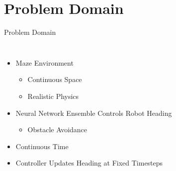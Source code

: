 \documentclass{beamer}
\begin{document}
\section{Problem Domain}

	\begin{frame}{Problem Domain}

		\begin{columns}[c c]
		
				
				\begin{itemize}
				\item Maze Environment
					\begin{itemize}
					\item Continuous Space
					\item Realistic Physics
					\end{itemize}
				\item Neural Network Ensemble Controls Robot Heading
					\begin{itemize}
						\item Obstacle Avoidance
					\end{itemize}
				\item Continuous Time
				\item Controller Updates Heading at Fixed Timesteps
				\end{itemize}


				\vspace{-0.5cm}
				

\end{columns}
\end{frame}
\end{document}
